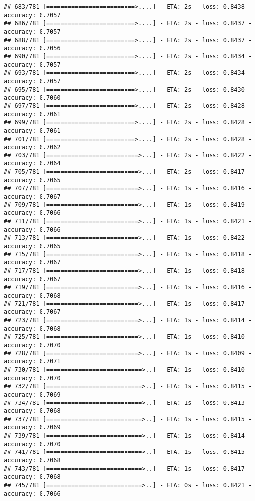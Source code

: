 \documentclass[
]{article}
\begin{document}
\begin{verbatim}
## 683/781 [=========================>....] - ETA: 2s - loss: 0.8438 - accuracy: 0.7057
## 686/781 [=========================>....] - ETA: 2s - loss: 0.8437 - accuracy: 0.7057
## 688/781 [=========================>....] - ETA: 2s - loss: 0.8437 - accuracy: 0.7056
## 690/781 [=========================>....] - ETA: 2s - loss: 0.8434 - accuracy: 0.7057
## 693/781 [=========================>....] - ETA: 2s - loss: 0.8434 - accuracy: 0.7057
## 695/781 [=========================>....] - ETA: 2s - loss: 0.8430 - accuracy: 0.7060
## 697/781 [=========================>....] - ETA: 2s - loss: 0.8428 - accuracy: 0.7061
## 699/781 [=========================>....] - ETA: 2s - loss: 0.8428 - accuracy: 0.7061
## 701/781 [=========================>....] - ETA: 2s - loss: 0.8428 - accuracy: 0.7062
## 703/781 [==========================>...] - ETA: 2s - loss: 0.8422 - accuracy: 0.7064
## 705/781 [==========================>...] - ETA: 2s - loss: 0.8417 - accuracy: 0.7065
## 707/781 [==========================>...] - ETA: 1s - loss: 0.8416 - accuracy: 0.7067
## 709/781 [==========================>...] - ETA: 1s - loss: 0.8419 - accuracy: 0.7066
## 711/781 [==========================>...] - ETA: 1s - loss: 0.8421 - accuracy: 0.7066
## 713/781 [==========================>...] - ETA: 1s - loss: 0.8422 - accuracy: 0.7065
## 715/781 [==========================>...] - ETA: 1s - loss: 0.8418 - accuracy: 0.7067
## 717/781 [==========================>...] - ETA: 1s - loss: 0.8418 - accuracy: 0.7067
## 719/781 [==========================>...] - ETA: 1s - loss: 0.8416 - accuracy: 0.7068
## 721/781 [==========================>...] - ETA: 1s - loss: 0.8417 - accuracy: 0.7067
## 723/781 [==========================>...] - ETA: 1s - loss: 0.8414 - accuracy: 0.7068
## 725/781 [==========================>...] - ETA: 1s - loss: 0.8410 - accuracy: 0.7070
## 728/781 [==========================>...] - ETA: 1s - loss: 0.8409 - accuracy: 0.7071
## 730/781 [===========================>..] - ETA: 1s - loss: 0.8410 - accuracy: 0.7070
## 732/781 [===========================>..] - ETA: 1s - loss: 0.8415 - accuracy: 0.7069
## 734/781 [===========================>..] - ETA: 1s - loss: 0.8413 - accuracy: 0.7068
## 737/781 [===========================>..] - ETA: 1s - loss: 0.8415 - accuracy: 0.7069
## 739/781 [===========================>..] - ETA: 1s - loss: 0.8414 - accuracy: 0.7070
## 741/781 [===========================>..] - ETA: 1s - loss: 0.8415 - accuracy: 0.7068
## 743/781 [===========================>..] - ETA: 1s - loss: 0.8417 - accuracy: 0.7068
## 745/781 [===========================>..] - ETA: 0s - loss: 0.8421 - accuracy: 0.7066

\end{verbatim}
\end{document}
